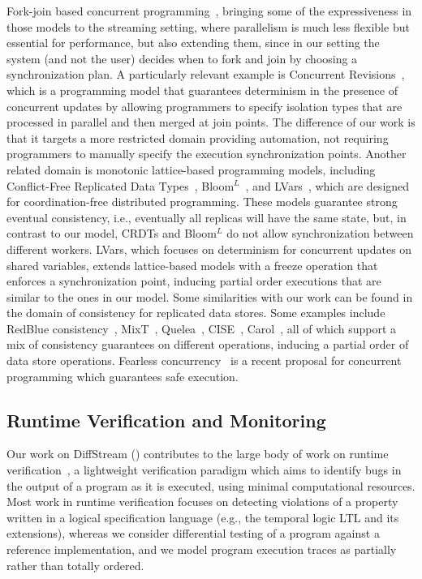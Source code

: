 Fork-join based
concurrent programming~\cite{frigo1998implementation,lea2000java},
bringing some of the expressiveness in those models to the streaming setting,
where parallelism is much less flexible but essential for performance,
but also extending them, since in our setting the system (and not the user) decides when to fork and join by choosing a synchronization plan.
A particularly relevant example is
Concurrent Revisions~\cite{burckhardt2010concurrent},
which is a programming model that guarantees determinism in the presence of concurrent updates by allowing programmers to specify isolation types that are processed in parallel and then merged at join points.
The difference of our work is that it targets a more restricted domain providing automation,
not requiring programmers to manually specify the execution synchronization points.
Another related domain is monotonic lattice-based programming models,
including
Conflict-Free Replicated Data Types~\cite{shapiro2011conflict},
Bloom$^L$~\cite{conway12},
and LVars~\cite{lvars13,lvars14},
which are designed for coordination-free distributed programming.
These models guarantee strong eventual consistency,
i.e., eventually all replicas will have the same state,
but, in contrast to our model, CRDTs and Bloom$^L$
do not allow synchronization between different workers.
LVars, which focuses on determinism for concurrent updates on shared variables,
extends lattice-based models with a freeze operation that enforces a synchronization point,
inducing partial order executions that are similar to the ones in our model.
Some similarities with our work can be found in the domain of consistency for replicated data stores.
Some examples include RedBlue consistency~\cite{li2012making},
MixT~\cite{milano2018mixt},
Quelea~\cite{sivaramakrishnan2015declarative},
CISE~\cite{gotsman16},
Carol~\cite{lewchenko2019sequential},
all of which support a mix of consistency guarantees on different operations,
inducing a partial order of data store operations.
Fearless concurrency~\cite{milano2022flexible} is a recent proposal for concurrent programming which guarantees safe execution.

\subsection{Runtime Verification and Monitoring}

Our work on DiffStream () contributes to the large body of work on runtime verification~\cite{leucker2009brief,havelund2004efficient}, a
lightweight verification paradigm which aims to identify bugs in the
output of a program as it is executed, using minimal computational
resources.  Most work in runtime verification focuses on detecting
violations of a property written in a logical specification language
(e.g., the temporal logic LTL and its extensions), whereas we consider
differential testing of a program against a reference implementation,
and we model program execution traces as partially rather than totally
ordered.

